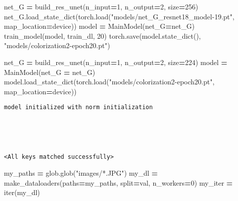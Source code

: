 \documentclass[
]{article}
\newenvironment{Shaded}{\begin{snugshade}}{\end{snugshade}}
\newcommand{\BuiltInTok}[1]{#1}
\newcommand{\DecValTok}[1]{\textcolor[rgb]{0.00,0.00,0.81}{#1}}
\newcommand{\NormalTok}[1]{#1}
\newcommand{\OperatorTok}[1]{\textcolor[rgb]{0.81,0.36,0.00}{\textbf{#1}}}
\newcommand{\StringTok}[1]{\textcolor[rgb]{0.31,0.60,0.02}{#1}}
\begin{document}
\begin{Shaded}
\begin{Highlighting}[]
\NormalTok{net\_G }\OperatorTok{=}\NormalTok{ build\_res\_unet(n\_input}\OperatorTok{=}\DecValTok{1}\NormalTok{, n\_output}\OperatorTok{=}\DecValTok{2}\NormalTok{, size}\OperatorTok{=}\DecValTok{256}\NormalTok{)}
\NormalTok{net\_G.load\_state\_dict(torch.load(}\StringTok{"models/net\_G\_resnet18\_model{-}19.pt"}\NormalTok{, map\_location}\OperatorTok{=}\NormalTok{device))}
\NormalTok{model }\OperatorTok{=}\NormalTok{ MainModel(net\_G}\OperatorTok{=}\NormalTok{net\_G)}
\NormalTok{train\_model(model, train\_dl, }\DecValTok{20}\NormalTok{)}
\NormalTok{torch.save(model.state\_dict(), }\StringTok{"models/colorization2{-}epoch20.pt"}\NormalTok{)}
\end{Highlighting}
\end{Shaded}

\begin{Shaded}
\begin{Highlighting}[]
\NormalTok{net\_G }\OperatorTok{=}\NormalTok{ build\_res\_unet(n\_input}\OperatorTok{=}\DecValTok{1}\NormalTok{, n\_output}\OperatorTok{=}\DecValTok{2}\NormalTok{, size}\OperatorTok{=}\DecValTok{224}\NormalTok{)}
\NormalTok{model }\OperatorTok{=}\NormalTok{ MainModel(net\_G }\OperatorTok{=}\NormalTok{ net\_G)}
\NormalTok{model.load\_state\_dict(torch.load(}\StringTok{"models/colorization2{-}epoch20.pt"}\NormalTok{, map\_location}\OperatorTok{=}\NormalTok{device))}
\end{Highlighting}
\end{Shaded}

\begin{verbatim}
model initialized with norm initialization





<All keys matched successfully>
\end{verbatim}

\begin{Shaded}
\begin{Highlighting}[]
\NormalTok{my\_paths }\OperatorTok{=}\NormalTok{ glob.glob(}\StringTok{"images/*.JPG"}\NormalTok{)}
\NormalTok{my\_dl }\OperatorTok{=}\NormalTok{ make\_dataloaders(paths}\OperatorTok{=}\NormalTok{my\_paths, split}\OperatorTok{=}\StringTok{\textquotesingle{}val\textquotesingle{}}\NormalTok{,  n\_workers}\OperatorTok{=}\DecValTok{0}\NormalTok{) }
\NormalTok{my\_iter }\OperatorTok{=} \BuiltInTok{iter}\NormalTok{(my\_dl)}
\end{Highlighting}
\end{Shaded}
\end{document}

